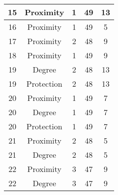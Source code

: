 \documentclass[results.tex]{subfiles}
\begin{document}
\begin{center}
\begin{tabular}{| c || c | c | c | c |}
            \hline
            15                      & Proximity                    & 1                      & 49                      & 13                   \\
            \hline
            16                      & Proximity                    & 1                      & 49                      & 5                    \\
            \hline
            17                      & Proximity                    & 2                      & 48                      & 9                    \\
            \hline
            18                      & Proximity                    & 1                      & 49                      & 9                    \\
            \hline
            19                      & Degree                       & 2                      & 48                      & 13                   \\
            \hline
            19                      & Protection                   & 2                      & 48                      & 13                   \\
            \hline
            20                      & Proximity                    & 1                      & 49                      & 7                    \\
            \hline
            20                      & Degree                       & 1                      & 49                      & 7                    \\
            \hline
            20                      & Protection                   & 1                      & 49                      & 7                    \\
            \hline
            21                      & Proximity                    & 2                      & 48                      & 5                    \\
            \hline
            21                      & Degree                       & 2                      & 48                      & 5                    \\
            \hline
            22                      & Proximity                    & 3                      & 47                      & 9                    \\
            \hline
            22                      & Degree                       & 3                      & 47                      & 9                    \\

\end{tabular}
\end{center}
\end{document}
